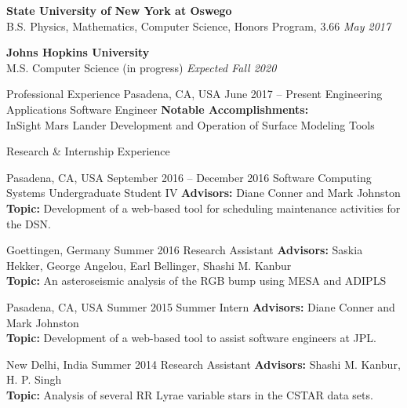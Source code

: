 \documentclass{resume} %
\begin{document}
\textbf{State University of New York at Oswego}
\\
B.S. Physics, Mathematics, Computer Science, Honors Program, 3.66
\hfill
\emph{May 2017}

\textbf{Johns Hopkins University}
\\
M.S. Computer Science (in progress)
\hfill
\emph{Expected Fall 2020}

\begin{rSection}{Professional Experience}{}
           {Pasadena, CA, USA}
           {June 2017 -- Present}
           {Engineering Applications Software Engineer}
           {
        \textbf{Notable Accomplishments:}\\
        InSight Mars Lander Development and Operation of Surface Modeling Tools
    }
\end{rSection}

\begin{rSection}{Research \& Internship Experience}{}

           {Pasadena, CA, USA}
           {September 2016 -- December 2016}
           {Software Computing Systems Undergraduate Student IV}
           {
    \textbf{Advisors:}
    Diane Conner and Mark Johnston
    \\
    \textbf{Topic:}
    Development of a web-based tool for scheduling maintenance activities for the DSN.
  }

           {Goettingen, Germany}
           {Summer 2016}
           {Research Assistant}
           {
    \textbf{Advisors:}
    Saskia Hekker, George Angelou, Earl Bellinger, Shashi M. Kanbur
    \\
    \textbf{Topic:}
    An asteroseismic analysis of the RGB bump using MESA and ADIPLS
  }

           {Pasadena, CA, USA}
           {Summer 2015}
           {Summer Intern}
           {
    \textbf{Advisors:}
    Diane Conner and Mark Johnston
    \\
    \textbf{Topic:}
    Development of a web-based tool to assist software engineers at JPL.
  }

           {New Delhi, India}
           {Summer 2014}
           {Research Assistant}
           {
    \textbf{Advisors:}
    Shashi M. Kanbur, H. P. Singh
    \\
    \textbf{Topic:}
    Analysis of several RR Lyrae variable stars in the CSTAR data sets.
  }

\end{rSection}
\end{document}
